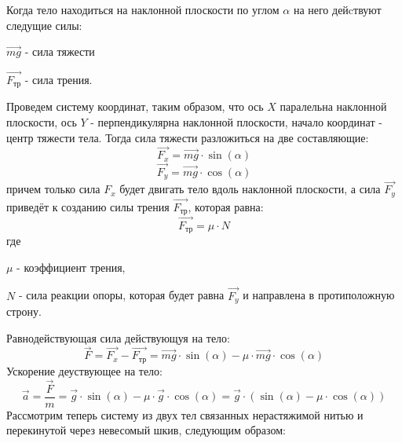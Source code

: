 \documentclass{minimal}
\begin{document}

    \noindent
    Когда тело находиться на наклонной плоскости по углом $\alpha$ на него дейcтвуют следущие силы: 

    $\vec{mg}$ - сила тяжести

    $\vec{F_{\text{тр}}}$ - сила трения. 

    \noindent
    Проведем систему координат, таким образом, что ось $X$ паралельна наклонной плоскости, ось $Y$ - перпендикулярна наклонной плоскости, начало координат - центр тяжести тела. Тогда сила тяжести разложиться на две составляющие:
    \[
        \vec{F_x} = \vec{mg} \cdot \sin(\alpha)
    \]
    \[
        \vec{F_y} = \vec{mg} \cdot \cos(\alpha)
    \]
    причем только сила  $F_x$ будет двигать тело вдоль наклонной плоскости, а сила $\vec{F_y}$ приведёт к созданию силы трения $\vec{F_{\text{тр}}}$, которая равна:
    \[
        \vec{F_{\text{тр}}} = \mu \cdot N
    \]
    где

    $\mu$ - коэффициент трения, 

    $N$ - сила реакции опоры, которая будет равна $\vec{F_y}$ и направлена в протиположную строну.

    Равнодействующая сила действующуя на тело:
    \[
        \vec{F} = \vec{F_x} - \vec{F_{\text{тр}}} = \vec{mg} \cdot \sin(\alpha) - \mu \cdot \vec{mg} \cdot \cos(\alpha)
    \]
    Ускорение деуствующее на тело:
    \[
        \vec{a} = \frac{\vec{F}}{m} = \vec{g} \cdot \sin(\alpha) - \mu \cdot \vec{g} \cdot \cos(\alpha) = \vec{g} \cdot (\sin(\alpha) - \mu \cdot \cos(\alpha))
    \]
    Рассмотрим теперь систему из двух тел связанных нерастяжимой нитью и перекинутой через невесомый шкив, следующим образом:
\end{document}
